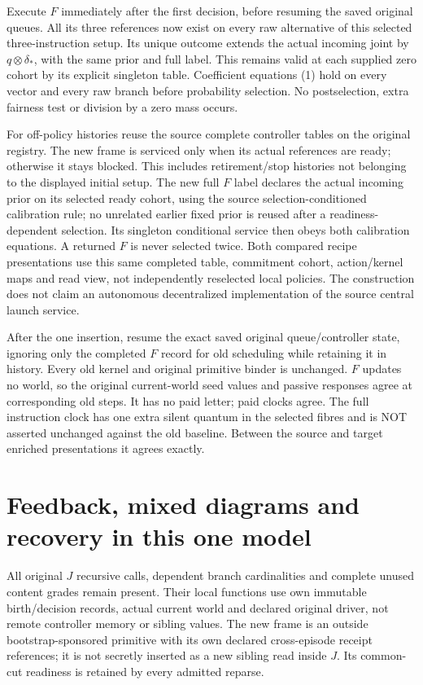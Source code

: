 \documentclass{article}
\begin{document}
Execute $F$ immediately after the first decision, before resuming the saved original queues. All its three references now exist on every raw alternative of this selected three-instruction setup. Its unique outcome extends the actual incoming joint by $q\otimes\delta_*$, with the same prior and full label. This remains valid at each supplied zero cohort by its explicit singleton table. Coefficient equations (1) hold on every vector and every raw branch before probability selection. No postselection, extra fairness test or division by a zero mass occurs.

For off-policy histories reuse the source complete controller tables on the original registry. The new frame is serviced only when its actual references are ready; otherwise it stays blocked. This includes retirement/stop histories not belonging to the displayed initial setup. The new full $F$ label declares the actual incoming prior on its selected ready cohort, using the source selection-conditioned calibration rule; no unrelated earlier fixed prior is reused after a readiness-dependent selection. Its singleton conditional service then obeys both calibration equations. A returned $F$ is never selected twice. Both compared recipe presentations use this same completed table, commitment cohort, action/kernel maps and read view, not independently reselected local policies. The construction does not claim an autonomous decentralized implementation of the source central launch service.

After the one insertion, resume the exact saved original queue/controller state, ignoring only the completed $F$ record for old scheduling while retaining it in history. Every old kernel and original primitive binder is unchanged. $F$ updates no world, so the original current-world seed values and passive responses agree at corresponding old steps. It has no paid letter; paid clocks agree. The full instruction clock has one extra silent quantum in the selected fibres and is NOT asserted unchanged against the old baseline. Between the source and target enriched presentations it agrees exactly.

\section{Feedback, mixed diagrams and recovery in this one model}
All original $J$ recursive calls, dependent branch cardinalities and complete unused content grades remain present. Their local functions use own immutable birth/decision records, actual current world and declared original driver, not remote controller memory or sibling values. The new frame is an outside bootstrap-sponsored primitive with its own declared cross-episode receipt references; it is not secretly inserted as a new sibling read inside $J$. Its common-cut readiness is retained by every admitted reparse.
\end{document}
